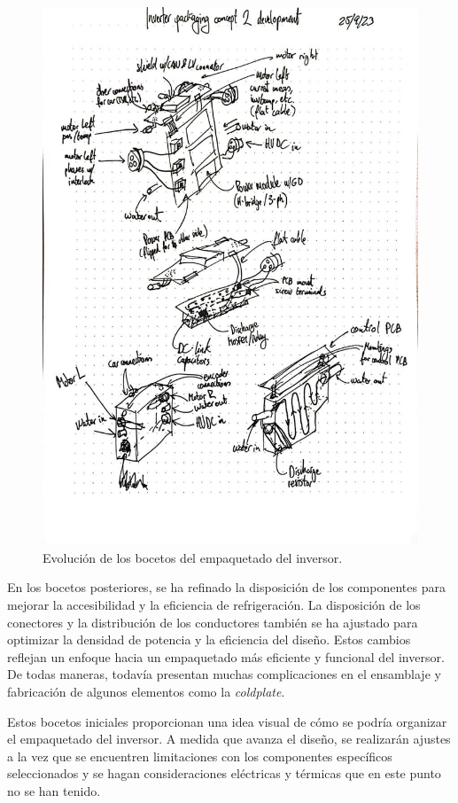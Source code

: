 \begin{figure}[H]
\begin{minipage}{0.45\textwidth}
		\includegraphics[width=\textwidth]{fig/boceto4}
	\end{minipage}
	\caption{Evolución de los bocetos del empaquetado del inversor.}
	\label{sketches}
\end{figure}

En los bocetos posteriores, se ha refinado la disposición de los componentes para mejorar la accesibilidad y la eficiencia de refrigeración. La disposición de los conectores y la distribución de los conductores también se ha ajustado para optimizar la densidad de potencia y la eficiencia del diseño. Estos cambios reflejan un enfoque hacia un empaquetado más eficiente y funcional del inversor. De todas maneras, todavía presentan muchas complicaciones en el ensamblaje y fabricación de algunos elementos como la \textit{coldplate}.

Estos bocetos iniciales proporcionan una idea visual de cómo se podría organizar el empaquetado del inversor. A medida que avanza el diseño, se realizarán ajustes a la vez que se encuentren limitaciones con los componentes específicos seleccionados y se hagan consideraciones eléctricas y térmicas que en este punto no se han tenido.

